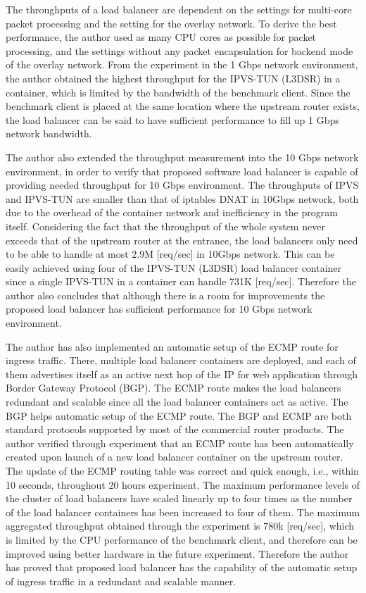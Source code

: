 The throughputs of a load balancer are dependent on the settings for multi-core packet processing and the setting for the overlay network.
To derive the best performance, the author used as many CPU cores as possible for packet processing, and the settings without any packet encapsulation for backend mode of the overlay network.
%
From the experiment in the 1 Gbps network environment, the author obtained the highest throughput for the IPVS-TUN (L3DSR) in a container, which is limited by the bandwidth of the benchmark client.
  Since the benchmark client is placed at the same location where the upstream router exists, the load balancer can be said to have sufficient performance to fill up 1 Gbps network bandwidth.

The author also extended the throughput measurement into the 10 Gbps network environment, in order to verify that proposed software load balancer is capable of providing needed throughput for 10 Gbps environment.
The throughputs of IPVS and IPVS-TUN are smaller than that of iptables DNAT in 10Gbps network, both due to the overhead of the container network and inefficiency in the program itself.
Considering the fact that the throughput of the whole system never exceeds that of the upstream router at the entrance, the load balancers only need to be able to handle at most 2.9M [req/sec] in 10Gbps network.
This can be easily achieved using four of the IPVS-TUN (L3DSR) load balancer container since a single IPVS-TUN in a container can handle 731K [req/sec].
Therefore the author also concludes that although there is a room for improvements the proposed load balancer has sufficient performance for 10 Gbps network environment.


The author has also implemented an automatic setup of the ECMP route for ingress traffic.
There, multiple load balancer containers are deployed, and each of them advertises itself as an active next hop of the IP for web application through Border Gateway Protocol (BGP).
The ECMP route makes the load balancers redundant and scalable since all the load balancer containers act as active.
%
The BGP helps automatic setup of the ECMP route.  
The BGP and ECMP are both standard protocols supported by most of the commercial router products.
%
The author verified through experiment that an ECMP route has been automatically created upon launch of a new load balancer container on the upstream router.
The update of the ECMP routing table was correct and quick enough, i.e., within 10 seconds, throughout 20 hours experiment.
The maximum performance levels of the cluster of load balancers have scaled linearly up to four times as the number of the load balancer containers has been increased to four of them.
The maximum aggregated throughput obtained through the experiment is 780k [req/sec], which is limited by the CPU performance of the benchmark client, and therefore can be improved using better hardware in the future experiment.
Therefore the author has proved that proposed load balancer has the capability of the automatic setup of ingress traffic in a redundant and scalable manner.
%

